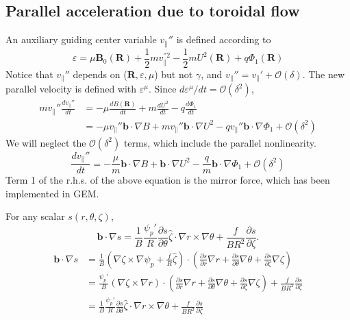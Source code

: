 \documentclass[12pt]{article}
\begin{document}
\begin{CJK*}{UTF8}{gbsn}
\section{Parallel acceleration due to toroidal flow}
An auxiliary guiding center variable $v_{\parallel}{''}$ is defined according to 
\begin{equation}
    \varepsilon = \mu\mathbf{B_\mathrm{0}(R)} + \frac{1}{2}mv_{\parallel}^{''2} - \frac{1}{2}mU^2\mathbf{(R)} + q\Phi_1\mathbf{(R)}
\end{equation}
Notice that $v_{\parallel}{''}$ depends on ($\mathbf{R},\varepsilon,\mu$) but not $\gamma$, and $v_{\parallel}{''}=v_{\parallel}{'}+\mathcal{O}(\delta)$.
The new parallel velocity is defined with $\varepsilon^{\mu}$. Since $d\varepsilon^{\mu}/dt=\mathcal{O}(\delta^2)$,
\begin{equation}
\begin{split}
    mv_{\parallel}''\frac{dv_{\parallel}''}{dt} &= -\mu\frac{dB\mathbf{(R)}}{dt} + m\frac{dU^2}{dt} - q\frac{d\Phi_1}{dt}\\
    &=-\mu v_{\parallel}''\mathbf{b}\cdot\nabla B + mv_{\parallel}''\mathbf{b}\cdot\nabla U^2 - qv_{\parallel}''
    \mathbf{b}\cdot\nabla\Phi_1 + \mathcal{O}(\delta^2)
\end{split}
\end{equation}
We will neglect the $\mathcal{O}(\delta^2)$ terms, which include the parallel nonlinearity.
\begin{equation}
    \frac{dv_{\parallel}''}{dt} = -\frac{\mu}{m}\mathbf{b}\cdot\nabla B + \mathbf{b}\cdot\nabla U^2 - \frac{q}{m}\mathbf{b}\cdot\nabla\Phi_1 + \mathcal{O}(\delta^2)
\end{equation}
Term 1 of the r.h.s. of the above equation is the mirror force, which has been implemented in GEM.

For any scalar $s(r,\theta,\zeta)$,
\begin{equation}
    \mathbf{b}\cdot\nabla s=\frac{1}{B}\frac{\psi_p'}{R}\frac{\partial s}{\partial \theta}\hat{\zeta}\cdot\nabla r \times \nabla\theta
    + \frac{f}{BR^2}\frac{\partial s}{\partial \zeta}.
\end{equation}
{\color{cyan}
\begin{equation*}
\begin{split}
    \mathbf{b}\cdot\nabla s&=\frac{1}{B}(\nabla\zeta\times\nabla\psi_p+\frac{f}{R}\hat{\zeta})\cdot(\frac{\partial s}{\partial r}\nabla r
    +\frac{\partial s}{\partial \theta}\nabla \theta+\frac{\partial s}{\partial \zeta}\nabla \zeta)\\
    &=\frac{\psi_p'}{B}(\nabla\zeta\times\nabla r)\cdot(\frac{\partial s}{\partial r}\nabla r
    +\frac{\partial s}{\partial \theta}\nabla \theta+\frac{\partial s}{\partial \zeta}\nabla \zeta)+\frac{f}{BR^2}\frac{\partial s}{\partial\zeta}\\
    &=\frac{1}{B}\frac{\psi_p'}{R}\frac{\partial s}{\partial \theta}\hat{\zeta}\cdot\nabla r \times \nabla\theta
    + \frac{f}{BR^2}\frac{\partial s}{\partial \zeta}
\end{split}
\end{equation*}
}


\end{CJK*}
\end{document}

